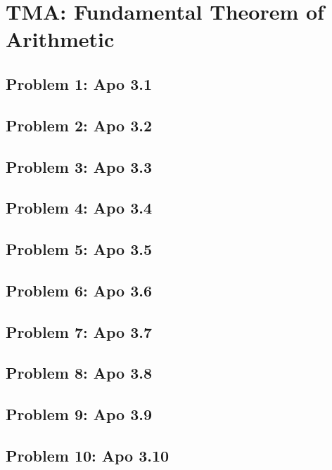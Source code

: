 \section{TMA: Fundamental Theorem of Arithmetic}

\subsection[Problem 1]{Problem 1: Apo 3.1}

\subsection[Problem 2]{Problem 2: Apo 3.2}

\subsection[Problem 3]{Problem 3: Apo 3.3}

\subsection[Problem 4]{Problem 4: Apo 3.4}

\subsection[Problem 5]{Problem 5: Apo 3.5}

\subsection[Problem 6]{Problem 6: Apo 3.6}

\subsection[Problem 7]{Problem 7: Apo 3.7}

\subsection[Problem 8]{Problem 8: Apo 3.8}

\subsection[Problem 9]{Problem 9: Apo 3.9}

\subsection[Problem 10]{Problem 10: Apo 3.10}